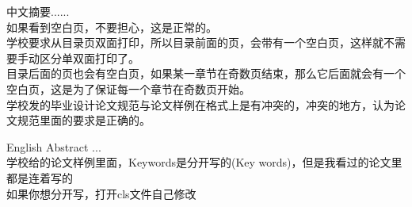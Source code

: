 \begin{cabstract}%
  中文摘要......\\

  
  如果看到空白页，不要担心，这是正常的。\\
  
  学校要求从目录页双面打印，所以目录前面的页，会带有一个空白页，这样就不需要手动区分单双面打印了。\\
  
  目录后面的页也会有空白页，如果某一章节在奇数页结束，那么它后面就会有一个空白页，这是为了保证每一个章节在奇数页开始。\\
  
  学校发的毕业设计论文规范与论文样例在格式上是有冲突的，冲突的地方，认为论文规范里面的要求是正确的。
\end{cabstract}

    
\begin{eabstract}%
  English Abstract ...\\

  
  学校给的论文样例里面，Keywords是分开写的(Key words)，但是我看过的论文里都是连着写的\\

  如果你想分开写，打开cls文件自己修改

  
\end{eabstract}

